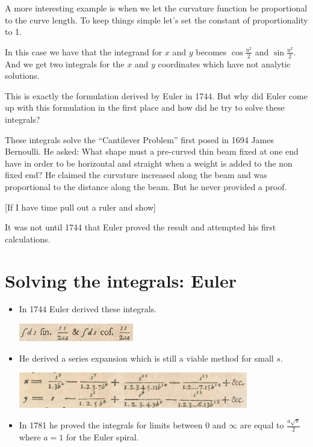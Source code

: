 \documentclass[]{article} %
\theoremstyle{definition}
\theoremstyle{theorem}
\begin{document}
A more interesting example is when we let the curvature function be proportional to the curve length. To keep things simple let's set the constant of proportionality to 1.

In this case we have that the integrand for $x$ and $y$ becomes $\cos \frac{u^2}{2}$ and $\sin \frac{u^2}{2}$. And we get two integrals for the $x$ and $y$ coordinates which have not analytic solutions. 

This is exactly the formulation derived by Euler in 1744. But why did Euler come up with this formulation in the first place and how did he try to solve these integrals?

These integrals solve the ``Cantilever Problem'' first posed in 1694 James Bernoulli. He asked: What shape must a pre-curved thin beam fixed at one end have in order to be horizontal and straight when a weight is added to the non fixed end? He claimed the curvature increased along the beam and was proportional to the distance along the beam. But he never provided a proof.

[If I have time pull out a ruler and show]

It was not until 1744 that Euler proved the result and attempted his first calculations.

\section{Solving the integrals: Euler}
\begin{tcolorbox}
	\begin{itemize}
		\item In 1744 Euler derived these integrals.
		
		\includegraphics[width=50mm, scale=0.5]{euler_scripture_1.png}	
		\item He derived a series expansion which is still a viable method for small $s$.	
		
		\includegraphics[width=100mm, scale=0.7]{euler_scripture.png}
		\item In 1781 he proved the integrals for limits between 0 and $\infty$ are equal to  $\frac{a \sqrt{\pi}}{2}$ where $a=1$ for the Euler spiral.
	\end{itemize}
\end{tcolorbox}
\end{document}
